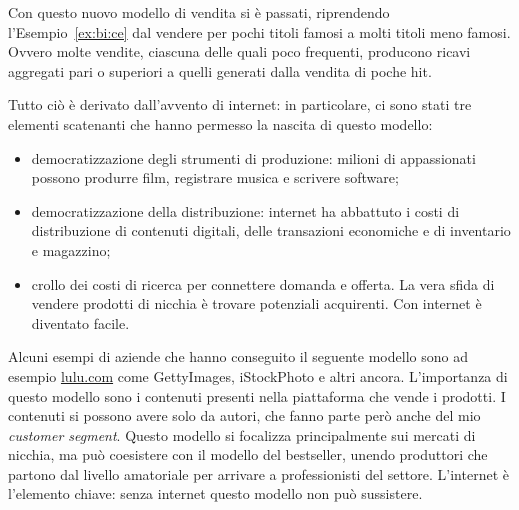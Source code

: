 Con questo nuovo modello di vendita si è passati, riprendendo
l'Esempio~\ref{ex:bi:ce} dal vendere per pochi titoli famosi a molti titoli
meno famosi. Ovvero molte vendite, ciascuna delle quali poco frequenti,
producono ricavi aggregati pari o superiori a quelli generati dalla vendita di
poche hit.

Tutto ciò è derivato dall'avvento di internet: in particolare, ci sono stati
tre elementi scatenanti che hanno permesso la nascita di questo modello:
\begin{itemize}
 \item democratizzazione degli strumenti di produzione: milioni di appassionati
possono produrre film, registrare musica e scrivere software;
 \item democratizzazione della distribuzione: internet ha abbattuto i costi di
distribuzione di contenuti digitali, delle transazioni economiche e di
inventario e magazzino;
 \item crollo dei costi di ricerca per connettere domanda e offerta. La vera
sfida di vendere prodotti di nicchia è trovare potenziali acquirenti. Con
internet è diventato facile.
\end{itemize}

Alcuni esempi di aziende che hanno conseguito il seguente modello sono ad
esempio \url{lulu.com} come GettyImages, iStockPhoto e altri ancora.
L'importanza di questo modello sono i contenuti presenti nella piattaforma che
vende i prodotti. I contenuti si possono avere solo da autori, che fanno parte
però anche del mio \textit{customer segment}. Questo modello si focalizza
principalmente sui mercati di nicchia, ma può coesistere con il modello del
bestseller, unendo produttori che partono dal livello amatoriale per arrivare a
professionisti del settore. L'internet è l'elemento chiave: senza internet
questo modello non può sussistere.

